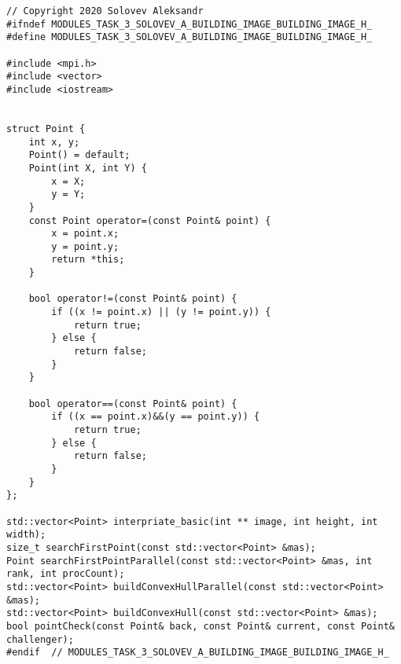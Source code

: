 \documentclass{report}
\begin{document}
\begin{lstlisting}
// Copyright 2020 Solovev Aleksandr
#ifndef MODULES_TASK_3_SOLOVEV_A_BUILDING_IMAGE_BUILDING_IMAGE_H_
#define MODULES_TASK_3_SOLOVEV_A_BUILDING_IMAGE_BUILDING_IMAGE_H_

#include <mpi.h>
#include <vector>
#include <iostream>


struct Point {
    int x, y;
    Point() = default;
    Point(int X, int Y) {
        x = X;
        y = Y;
    }
    const Point operator=(const Point& point) {
        x = point.x;
        y = point.y;
        return *this;
    }

    bool operator!=(const Point& point) {
        if ((x != point.x) || (y != point.y)) {
            return true;
        } else {
            return false;
        }
    }

    bool operator==(const Point& point) {
        if ((x == point.x)&&(y == point.y)) {
            return true;
        } else {
            return false;
        }
    }
};

std::vector<Point> interpriate_basic(int ** image, int height, int width);
size_t searchFirstPoint(const std::vector<Point> &mas);
Point searchFirstPointParallel(const std::vector<Point> &mas, int rank, int procCount);
std::vector<Point> buildConvexHullParallel(const std::vector<Point> &mas);
std::vector<Point> buildConvexHull(const std::vector<Point> &mas);
bool pointCheck(const Point& back, const Point& current, const Point& challenger);
#endif  // MODULES_TASK_3_SOLOVEV_A_BUILDING_IMAGE_BUILDING_IMAGE_H_
\end{lstlisting}
\end{document}
